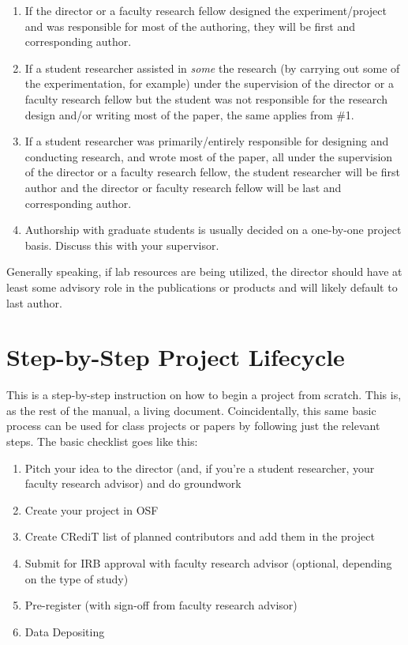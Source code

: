 \documentclass[]{tufte-book}
\providecommand{\tightlist}{%
  \setlength{\itemsep}{0pt}\setlength{\parskip}{0pt}}
\begin{document}
\begin{enumerate}
\def\labelenumi{\arabic{enumi}.}
\tightlist
\item
  If the director or a faculty research fellow designed the experiment/project and was responsible for most of the authoring, they will be first and corresponding author.
\item
  If a student researcher assisted in \emph{some} the research (by carrying out some of the experimentation, for example) under the supervision of the director or a faculty research fellow but the student was not responsible for the research design and/or writing most of the paper, the same applies from \#1.
\item
  If a student researcher was primarily/entirely responsible for designing and conducting research, and wrote most of the paper, all under the supervision of the director or a faculty research fellow, the student researcher will be first author and the director or faculty research fellow will be last and corresponding author.
\item
  Authorship with graduate students is usually decided on a one-by-one project basis. Discuss this with your supervisor.
\end{enumerate}

Generally speaking, if lab resources are being utilized, the director should have at least some advisory role in the publications or products and will likely default to last author.

\hypertarget{appendix-appendix}{%
\appendix}


\hypertarget{step-by-step-project-lifecycle}{%
\chapter{Step-by-Step Project Lifecycle}\label{step-by-step-project-lifecycle}}

This is a step-by-step instruction on how to begin a project from scratch. This is, as the rest of the manual, a living document. Coincidentally, this same basic process can be used for class projects or papers by following just the relevant steps. The basic checklist goes like this:

\begin{enumerate}
\def\labelenumi{\arabic{enumi}.}
\tightlist
\item
  Pitch your idea to the director (and, if you're a student researcher, your faculty research advisor) and do groundwork
\item
  Create your project in OSF
\item
  Create CRediT list of planned contributors and add them in the project
\item
  Submit for IRB approval with faculty research advisor (optional, depending on the type of study)
\item
  Pre-register (with sign-off from faculty research advisor)
\item
  Data Depositing
\end{enumerate}
\end{document}
